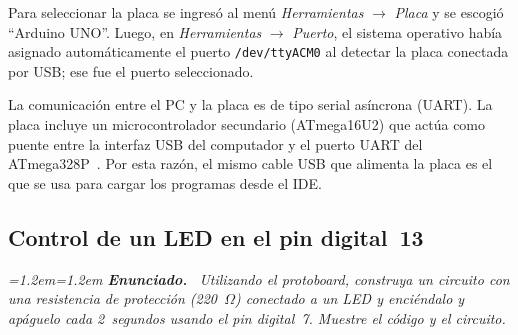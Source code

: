 \documentclass[11pt,a4paper]{article}
\newenvironment{enunciado}{%
  \par\smallskip
    \noindent\begingroup\small\itshape
      \leftskip=1.2em\rightskip=1.2em
        \textbf{\upshape Enunciado.}\ }{\par\endgroup\smallskip}
\begin{document}
                                                                                                           Para seleccionar la placa se ingres\'o al men\'u \emph{Herramientas} $\to$ \emph{Placa}
                                                                                                           y se escogi\'o ``Arduino UNO''. Luego, en \emph{Herramientas} $\to$ \emph{Puerto},
                                                                                                           el sistema operativo hab\'ia asignado autom\'aticamente el puerto \texttt{/dev/ttyACM0}
                                                                                                           al detectar la placa conectada por USB; ese fue el puerto seleccionado.

                                                                                                           La comunicaci\'on entre el PC y la placa es de tipo serial as\'incrona (UART). La placa
                                                                                                           incluye un microcontrolador secundario (ATmega16U2) que actúa como puente entre la
                                                                                                           interfaz USB del computador y el puerto UART del ATmega328P~\cite{unoboard}. Por esta
                                                                                                           raz\'on, el mismo cable USB que alimenta la placa es el que se usa para cargar los
                                                                                                           programas desde el IDE.

                                                                                                           \subsection*{Control de un LED en el pin digital~13}

                                                                                                           \begin{enunciado}
                                                                                                           Utilizando el protoboard, construya un circuito con una resistencia de protecci\'on
                                                                                                           (220~$\Omega$) conectado a un LED y enci\'endalo y ap\'aguelo cada 2~segundos usando el
                                                                                                           pin digital~7. Muestre el c\'odigo y el circuito.
                                                                                                           \end{enunciado}
\end{document}
